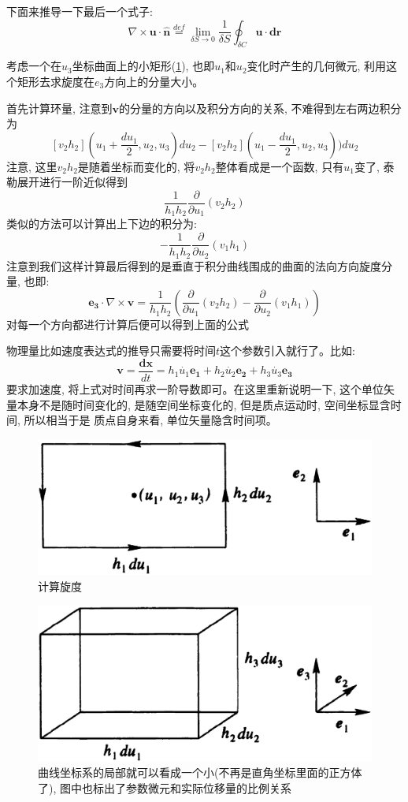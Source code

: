 \begin{thinknote}
    下面来推导一下最后一个式子:
    $$\nabla \times \bm{u} \cdot \bm{\hat{n}} \overset{def}{=}\lim_{\delta S \to 0}\frac{1}{\delta S} \oint_{\delta C} \bm{u} \cdot \bm{dr}$$

    考虑一个在$u_3$坐标曲面上的小矩形(\ref{旋度计算}), 也即$u_1$和$u_2$变化时产生的几何微元, 利用这个矩形去求旋度在$e_3$方向上的分量大小。

    首先计算环量, 注意到$\bm{v}$的分量的方向以及积分方向的关系, 不难得到左右两边积分为
    $$[v_2h_2](u_1+\frac{du_1}{2},u_2,u_3)du_2-[v_2h_2](u_1-\frac{du_1}{2},u_2,u_3))du_2$$
    注意, 这里$v_2h_2$是随着坐标而变化的, 将$v_2h_2$整体看成是一个函数, 只有$u_1$变了, 泰勒展开进行一阶近似得到
    $$\frac{1}{h_1h_2}\frac{\partial}{\partial u_1}(v_2h_2)$$
    类似的方法可以计算出上下边的积分为:
    $$-\frac{1}{h_1h_2}\frac{\partial}{\partial u_2}(v_1h_1)$$
    注意到我们这样计算最后得到的是垂直于积分曲线围成的曲面的法向方向旋度分量, 也即:
    $$\bm{e_3}\cdot\nabla\times\bm{v}=\frac{1}{h_1h_2}\left(\frac{\partial}{\partial u_1}(v_2h_2)-\frac{\partial}{\partial u_2}(v_1h_1)\right)$$
    对每一个方向都进行计算后便可以得到上面的公式
\end{thinknote}
物理量比如速度表达式的推导只需要将时间$t$这个参数引入就行了。比如:$$\bm{v}=\frac{\bm{dx}}{dt}=h_1\dot{u_1}\bm{e_1}+h_2\dot{u_2}\bm{e_2}+h_3\dot{u_3}\bm{e_3}$$
要求加速度, 将上式对时间再求一阶导数即可。在这里重新说明一下, 这个单位矢量本身不是随时间变化的, 是随空间坐标变化的, 但是质点运动时, 空间坐标显含时间, 所以相当于是
质点自身来看, 单位矢量隐含时间项。
\begin{figure}[htbp]
    \centering
    \label{旋度计算}
    \includegraphics[scale=0.3]{fig/a-3.eps}
    \caption{计算旋度}
\end{figure}
\begin{figure}[htbp]
    \centering
    \label{曲线坐标微元}
    \includegraphics[scale=0.26]{fig/a-2.eps}
    \caption{曲线坐标系的局部就可以看成一个小(不再是直角坐标里面的正方体了), 图中也标出了参数微元和实际位移量的比例关系}
\end{figure}
